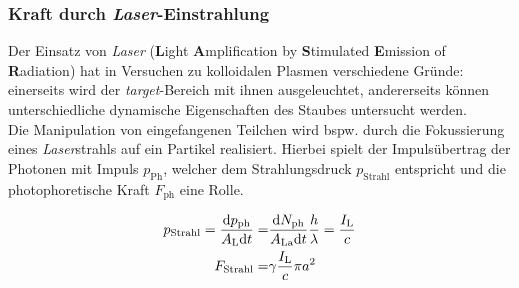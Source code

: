 \documentclass[numbers=noenddot,a4paper]{scrartcl}
\newcommand{\diff}{\textnormal{d}}
\newcommand{\ix}[1]{_\text{#1}}
\newcommand{\tilt}[1]{\textit{#1}}
\newcommand{\fett}[1]{\textbf{#1}}
\begin{document}
			\subsubsection{Kraft durch \tilt{Laser}-Einstrahlung}
			
				Der Einsatz von \tilt{Laser} (\fett{L}ight \fett{A}mplification by \fett{S}timulated \fett{E}mission of \fett{R}adiation) hat in Versuchen zu kolloidalen Plasmen verschiedene Gründe: einerseits wird der \tilt{target}-Bereich mit ihnen ausgeleuchtet, andererseits können unterschiedliche dynamische Eigenschaften des Staubes untersucht werden.\\
				Die Manipulation von eingefangenen Teilchen wird bspw. durch die Fokussierung eines \tilt{Laser}strahls auf ein Partikel realisiert. Hierbei spielt der Impulsübertrag der Photonen mit Impuls $p\ix{Ph}$, welcher dem Strahlungsdruck $p\ix{Strahl}$ entspricht und die photophoretische Kraft $F\ix{ph}$ eine Rolle.
				
					\begin{align}
						p\ix{Strahl}=\frac{\diff p\ix{ph}}{A\ix{L}\diff t}=&\frac{\diff N\ix{ph}}{A\ix{La}\diff t}\frac{h}{\lambda}=\frac{I\ix{L}}{c} \nonumber \\
						F\ix{Strahl}=&\gamma\frac{I\ix{L}}{c}\pi a^2 \label{eq:strahl}
					\end{align}
					
\end{document}
